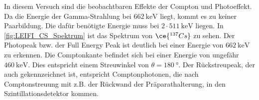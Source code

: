 
In diesem Versuch sind die beobachtbaren Effekte der Compton und Photoeffekt.
Da die Energie der Gamma-Strahlung bei $\SI{662}{\kilo\electronvolt}$ \cite{LEIFI} liegt, kommt es zu keiner Paarbildung.
Die dafür benötigte Energie muss bei $2 \cdot \SI{511}{\kilo\electronvolt}$ liegen.
In \autoref{fig:LEIFI_CS_Spektrum} ist das Spektrum von $\ce{^{137}Cs}$ zu sehen.
Der Photopeak bzw. der Full Energy Peak ist deutlich bei einer Energie von $\SI{662}{\kilo\electronvolt}$ zu erkennen. 
Die Comptonkante befindet sich bei einer Energie von ungefähr $\SI{460}{\kilo\electronvolt}$. Dies 
entspricht einem Streuwinkel von $\theta = \SI{180}{\degree}$. Der Rückstreupeak, der auch gekennzeichnet ist, 
entspricht Comptonphotonen, die nach Comptonstreuung mit z.B. der Rückwand der Präparathalterung, in den Szintillationsdetektor kommen. 